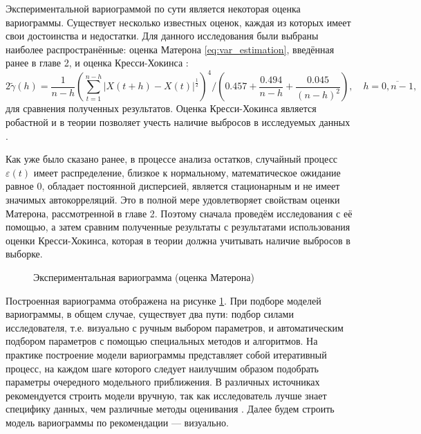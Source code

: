 Экспериментальной вариограммой по сути является некоторая оценка вариограммы. Существует несколько известных оценок, каждая из которых имеет свои достоинства и недостатки. Для данного исследования были выбраны наиболее распространённые: оценка Матерона \eqref{eq:var_estimation}, введённая ранее в главе 2, и оценка Кресси-Хокинса \cite{cressie1993statistics, dutter}:
\begin{equation*}
	2 \tilde{\gamma}(h) = \frac{1}{n - h} (\sum_{t = 1}^{n - h} | X(t + h) - X(t) |^{\frac{1}{2}} )^4 / (0.457 + \frac{0.494}{n - h} + \frac{0.045}{(n - h)^2}), \quad h = \overline{0, n - 1},
\end{equation*}
для сравнения полученных результатов. Оценка Кресси-Хокинса является робастной и в теории позволяет учесть наличие выбросов в исследуемых данных \cite{MINGOTI2008}.

Как уже было сказано ранее, в процессе анализа остатков, случайный процесс $ \varepsilon(t) $ имеет распределение, близкое к нормальному, математическое ожидание равное $ 0 $, обладает постоянной дисперсией, является стационарным и не имеет значимых автокорреляций. Это в полной мере удовлетворяет свойствам оценки Матерона, рассмотренной в главе 2. Поэтому сначала проведём исследования с её помощью, а затем сравним полученные результаты с результатами использования оценки Кресси-Хокинса, которая в теории должна учитывать наличие выбросов в выборке.

\begin{figure}[ht]
\caption{Экспериментальная вариограмма (оценка Матерона)}
\label{img:variogram}
\end{figure}

Построенная вариограмма отображена на рисунке \ref{img:variogram}. При подборе моделей вариограммы, в общем случае, существует два пути: подбор силами исследователя, т.е. визуально с ручным выбором параметров, и автоматическим подбором параметров с помощью специальных методов и алгоритмов. На практике построение модели вариограммы представляет собой итеративный процесс, на каждом шаге которого следует наилучшим образом подобрать параметры очередного модельного приближения. В различных источниках рекомендуется строить модели вручную, так как исследователь лучше знает специфику данных, чем различные методы оценивания \cite{geostat2010}. Далее будем строить модель вариограммы по рекомендации --- визуально.

